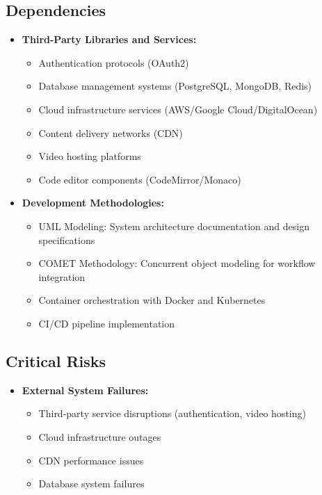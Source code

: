 \documentclass[a4paper, 11pt]{scrreprt}
\begin{document}
\subsection{Dependencies}
\begin{itemize}
    \item \textbf{Third-Party Libraries and Services:}
        \begin{itemize}
            \item Authentication protocols (OAuth2)
            \item Database management systems (PostgreSQL, MongoDB, Redis)
            \item Cloud infrastructure services (AWS/Google Cloud/DigitalOcean)
            \item Content delivery networks (CDN)
            \item Video hosting platforms
            \item Code editor components (CodeMirror/Monaco)
        \end{itemize}
    \item \textbf{Development Methodologies:}
        \begin{itemize}
            \item UML Modeling: System architecture documentation and design specifications
            \item COMET Methodology: Concurrent object modeling for workflow integration
            \item Container orchestration with Docker and Kubernetes
            \item CI/CD pipeline implementation
        \end{itemize}
\end{itemize}

\subsection{Critical Risks}
\begin{itemize}
    \item \textbf{External System Failures:}
        \begin{itemize}
            \item Third-party service disruptions (authentication, video hosting)
            \item Cloud infrastructure outages
            \item CDN performance issues
            \item Database system failures
        \end{itemize}
\end{itemize}
\end{document}
